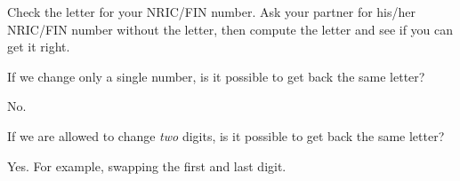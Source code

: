 \documentclass[a4paper,12pt]{article}
\begin{document}
\begin{question}[skip-below=3\baselineskip]
Check the letter for your NRIC/FIN number. Ask your partner for
his/her NRIC/FIN number without the letter, then compute
the letter and see if you can get it right.
\end{question}

\begin{question}[skip-below=3\baselineskip]
If we change only a single number, is it possible to get back the same letter?
\end{question}

\begin{solution}
No.
\end{solution}

\begin{question}[skip-below=3\baselineskip]
If we are allowed to change \emph{two} digits, is it possible to get back the
same letter?
\end{question}

\begin{solution}
Yes. For example, swapping the first and last digit.
\end{solution}
\end{document}
